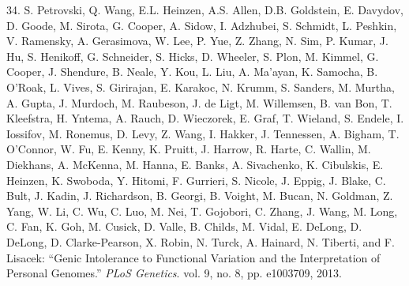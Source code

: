 \documentclass[12pt,twoside]{reedthesis}
\begin{document}
  \hypertarget{ref-Petrovski2013}{}
  34. S. Petrovski, Q. Wang, E.L. Heinzen, A.S. Allen, D.B. Goldstein, E.
  Davydov, D. Goode, M. Sirota, G. Cooper, A. Sidow, I. Adzhubei, S.
  Schmidt, L. Peshkin, V. Ramensky, A. Gerasimova, W. Lee, P. Yue, Z.
  Zhang, N. Sim, P. Kumar, J. Hu, S. Henikoff, G. Schneider, S. Hicks, D.
  Wheeler, S. Plon, M. Kimmel, G. Cooper, J. Shendure, B. Neale, Y. Kou,
  L. Liu, A. Ma'ayan, K. Samocha, B. O'Roak, L. Vives, S. Girirajan, E.
  Karakoc, N. Krumm, S. Sanders, M. Murtha, A. Gupta, J. Murdoch, M.
  Raubeson, J. de Ligt, M. Willemsen, B. van Bon, T. Kleefstra, H. Yntema,
  A. Rauch, D. Wieczorek, E. Graf, T. Wieland, S. Endele, I. Iossifov, M.
  Ronemus, D. Levy, Z. Wang, I. Hakker, J. Tennessen, A. Bigham, T.
  O'Connor, W. Fu, E. Kenny, K. Pruitt, J. Harrow, R. Harte, C. Wallin, M.
  Diekhans, A. McKenna, M. Hanna, E. Banks, A. Sivachenko, K. Cibulskis,
  E. Heinzen, K. Swoboda, Y. Hitomi, F. Gurrieri, S. Nicole, J. Eppig, J.
  Blake, C. Bult, J. Kadin, J. Richardson, B. Georgi, B. Voight, M. Bucan,
  N. Goldman, Z. Yang, W. Li, C. Wu, C. Luo, M. Nei, T. Gojobori, C.
  Zhang, J. Wang, M. Long, C. Fan, K. Goh, M. Cusick, D. Valle, B. Childs,
  M. Vidal, E. DeLong, D. DeLong, D. Clarke-Pearson, X. Robin, N. Turck,
  A. Hainard, N. Tiberti, and F. Lisacek: ``Genic Intolerance to
  Functional Variation and the Interpretation of Personal Genomes.''
  \emph{PLoS Genetics}. vol. 9, no. 8, pp. e1003709, 2013.


\end{document}
